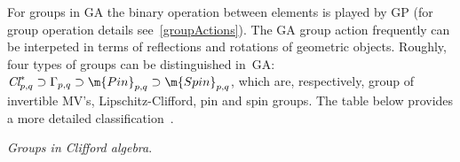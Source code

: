 For groups in GA the binary operation between elements is played by GP (for group operation details see~\ref{groupActions}).
The GA group action frequently can be interpeted in terms of reflections and rotations of geometric objects. Roughly, four types of groups can
be distinguished in~GA:
$\textit{Cl}_{p,q}^*\supset\Gamma_{p,q}\supset\m{Pin}_{p,q}\supset\m{Spin}_{p,q}$,
which are, respectively, group of invertible MV's,
Lipschitz-Clifford, pin and spin groups. The table below provides a
more detailed classification~\cite{Lundholm09,Che55}.
\begin{unit} \textit{Groups in Clifford algebra}.
\begin{center}\label{TypesOfGroups}


\end{center}
\end{unit}
